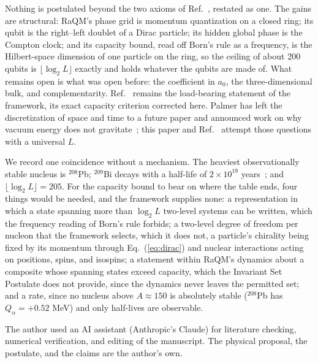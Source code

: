 \documentclass[aps,prd,twocolumn,superscriptaddress,nofootinbib]{revtex4-2}
\begin{document}
Nothing is postulated beyond the two axioms of Ref.~\cite{korytko2026}, restated as one. The gains are structural: RaQM's phase grid is momentum quantization on a closed ring; its qubit is the right--left doublet of a Dirac particle; its hidden global phase is the Compton clock; and its capacity bound, read off Born's rule as a frequency, is the Hilbert-space dimension of one particle on the ring, so the ceiling of about 200 qubits is $\lfloor\log_2 L\rfloor$ exactly and holds whatever the qubits are made of. What remains open is what was open before: the coefficient in $a_0$, the three-dimensional bulk, and complementarity. Ref.~\cite{korytko2026} remains the load-bearing statement of the framework, its exact capacity criterion corrected here. Palmer has left the discretization of space and time to a future paper and announced work on why vacuum energy does not gravitate~\cite{palmer2026c}; this paper and Ref.~\cite{korytko2026b} attempt those questions with a universal $L$.

We record one coincidence without a mechanism. The heaviest observationally stable nucleus is $^{208}$Pb; $^{209}$Bi decays with a half-life of $2\times10^{19}$ years~\cite{demarcillac2003,nubase2020}; and $\lfloor\log_2 L\rfloor = 205$. For the capacity bound to bear on where the table ends, four things would be needed, and the framework supplies none: a representation in which a state spanning more than $\log_2 L$ two-level systems can be written, which the frequency reading of Born's rule forbids; a two-level degree of freedom per nucleon that the framework selects, which it does not, a particle's chirality being fixed by its momentum through Eq.~(\ref{eq:dirac}) and nuclear interactions acting on positions, spins, and isospins; a statement within RaQM's dynamics about a composite whose spanning states exceed capacity, which the Invariant Set Postulate does not provide, since the dynamics never leaves the permitted set; and a rate, since no nucleus above $A\approx150$ is absolutely stable ($^{208}$Pb has $Q_\alpha = +0.52$ MeV) and only half-lives are observable.

\begin{acknowledgments}
The author used an AI assistant (Anthropic's Claude) for literature checking, numerical verification, and editing of the manuscript. The physical proposal, the postulate, and the claims are the author's own.
\end{acknowledgments}
\end{document}
